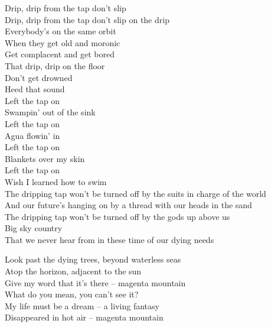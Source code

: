 Drip, drip from the tap don't slip \\
Drip, drip from the tap don't slip on the drip \\

Everybody's on the same orbit \\
When they get old and moronic \\
Get complacent and get bored \\
That drip, drip on the floor \\

Don't get drowned \\
Heed that sound \\

Left the tap on \\
Swampin' out of the sink \\
Left the tap on \\
Agua flowin' in \\
Left the tap on \\
Blankets over my skin \\
Left the tap on \\
Wish I learned how to swim \\

The dripping tap won't be turned off by the suits in charge of the world \\
And our future's hanging on by a thread with our heads in the sand \\
The dripping tap won't be turned off by the gods up above us \\
Big sky country \\
That we never hear from in these time of our dying needs \\




Look past the dying trees, beyond waterless seas \\
Atop the horizon, adjacent to the sun \\
Give my word that it's there -- magenta mountain \\

What do you mean, you can't see it? \\
My life must be a dream -- a living fantasy \\
Disappeared in hot air -- magenta mountain \\

